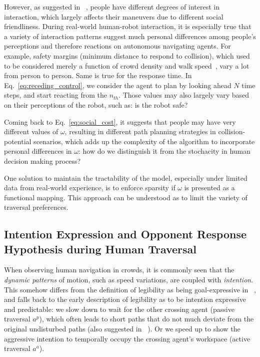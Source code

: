 \documentclass[conference]{IEEEtran}
\begin{document}
However, as suggested in ~\cite{hansen2009adaptive},
people have different degrees of interest in interaction, which largely 
affects their maneuvers due to different social friendliness. During 
real-world human-robot interaction, it is especially true that a variety of 
interaction patterns suggest much personal differences among 
people's perceptions and therefore reactions on autonomous navigating agents. For 
example, safety margins (minimum distance to respond to collision), which used 
to be considered merely a function of crowd density and walk speed~\cite{helbing1995social},
vary a lot from person to person. Same is true for the response time. In 
Eq.~\ref{eq:receding_control}, we consider the agent to plan by looking ahead 
$N$ time steps, and start reacting from the $n_{th}$. Those values may also largely 
vary based on their perceptions of the robot, such as: is the robot safe?  

Coming back to Eq.~\ref{eq:social_cost}, it suggests that people may have 
very different values of $\omega$, resulting in different path planning 
strategies in collision-potential scenarios, which adds up the complexity of the 
algorithm to incorporate personal differences in $\omega$: how do we 
distinguish it from the stochacity in human decision making process? 


One solution to maintain the tractability of the model, especially under 
limited data from real-world experience, is to enforce sparsity if $\omega$ is 
presented as a functional mapping. This approach can be understood as to limit 
the variety of traversal preferences.
\vspace{-.3em}
\subsection{Intention Expression and Opponent Response Hypothesis during Human Traversal}
When observing human navigation in crowds, it is commonly seen that the 
\textit{dynamic patterns} of motion, such as speed variations, are coupled 
with \textit{intention}. This somehow differs from the 
definition of legibility as being goal-expressive in 
~\cite{dragan2013legibility}, and falls back to the early description of 
legibility as to be intention 
expressive and predictable: we slow down to wait for the other crossing agent 
(passive traversal $a^p$), which often leads to short paths that do not much 
deviate from the original undisturbed paths (also suggested in 
~\cite{kruse2012legible}). Or we speed up to show the 
aggressive intention to temporally occupy the crossing agent's workspace (active 
traversal $a^a$). 
\end{document}
